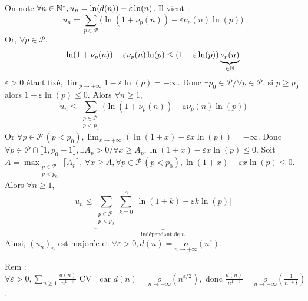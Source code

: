 \begin{solution}
On note $\forall n \in \mathbb N^*, u_n = \ln(d(n)) - \varepsilon \ln(n)$.
Il vient :
\[ u_n = \sum_{p \in \mathcal{P}} \bigl(\ln(1 + \nu_p(n)) - \varepsilon \nu_p(n) \ln(p)\bigr) \]
Or, $\forall p \in \mathcal{P}$,
\[ \ln(1 + \nu_p(n)) - \varepsilon \nu_p(n) \ln(p) \leq (1 - \varepsilon \ln(p)) \underbrace{\nu_p(n)}_{\in \mathbb N} \]
$\varepsilon > 0$ étant fixé, $\lim_{p \to +\infty} 1 - \varepsilon \ln(p) = -\infty$.
Donc $\exists p_0 \in \mathcal{P} / \forall p \in \mathcal{P}$, si $p \geq p_0$ alors $1 - \varepsilon \ln(p) \leq 0$.
Alors $\forall n \geq 1$,
\[ u_n \leq \sum_{\substack{p \in \mathcal{P} \\ p < p_0}} \bigl(\ln(1 + \nu_p(n)) - \varepsilon \nu_p(n) \ln(p)\bigr) \]
Or $\forall p \in \mathcal{P} \, (p < p_0), \lim_{x \to +\infty} (\ln(1+x) - \varepsilon x \ln(p)) = -\infty$.
Donc $\forall p \in \mathcal{P} \cap \llbracket 1, p_0 - 1 \rrbracket, \exists A_p > 0 / \forall x \geq A_p, \ln(1+x) - \varepsilon x \ln(p) \leq 0$.
Soit $A = \max_{\substack{p \in \mathcal{P} \\ p < p_0}} \lceil A_p \rceil$, $\forall x \geq A, \forall p \in \mathcal{P} \, (p < p_0), \ln(1+x) - \varepsilon x \ln(p) \leq 0$.
Alors $\forall n \geq 1$,
\[ u_n \leq \underbrace{\sum_{\substack{p \in \mathcal{P} \\ p < p_0}} \sum_{k=0}^A |\ln(1+k) - \varepsilon k \ln(p)|}_{\text{indépendant de } n} \]
Ainsi, $(u_n)_n$ est majorée et $\forall \varepsilon > 0, \boxed{d(n) = \underset{n \to +\infty}{o}(n^\varepsilon)}$.

\begin{remarkbox}
Rem : $\forall \varepsilon > 0, \sum_{n \geq 1} \frac{d(n)}{n^{1+\varepsilon}} \text{ CV} \quad \text{car } d(n) = \underset{n \to +\infty}{o}(n^{\varepsilon/2}), \text{ donc } \frac{d(n)}{n^{1+\varepsilon}} = \underset{n \to +\infty}{o}\left(\frac{1}{n^{1+\frac{\varepsilon}{2}}}\right)$.
\end{remarkbox}
\end{solution}
